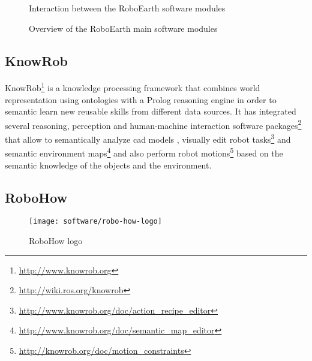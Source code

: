 \begin{figure}[H]
	\begin{floatrow}[2]
		{\caption[Interaction between the RoboEarth software modules]{Interaction between the RoboEarth software modules \cite{DiMarco2013}}\label{fig:robo-earth-software-interaction}}

		{\caption[Overview of the RoboEarth main software modules]{Overview of the RoboEarth main software modules\protect\footnotemark}\label{fig:robo-earth-software-overview}}
	\end{floatrow}
\end{figure}


\subsection{KnowRob}

KnowRob\footnote{\url{http://www.knowrob.org}} \cite{tenorth2011PhD,Tenorth2013k} is a knowledge processing framework that combines world representation using ontologies with a Prolog reasoning engine in order to semantic learn new reusable skills from different data sources. It has integrated several reasoning, perception and human-machine interaction software packages\footnote{\url{http://wiki.ros.org/knowrob}} that allow to semantically analyze \gls{cad} models \cite{Lavoue2005,Tenorth2013cad}, visually edit robot tasks\footnote{\url{http://www.knowrob.org/doc/action_recipe_editor}} and semantic environment maps\footnote{\url{http://www.knowrob.org/doc/semantic_map_editor}} \cite{Pangercic2012} and also perform robot motions\footnote{\url{http://knowrob.org/doc/motion_constraints}} \cite{tenorth14motiontemplates} based on the semantic knowledge of the objects and the environment.


\subsection{RoboHow}

\begin{wrapfigure}{r}{0.23\textwidth}
	\centering
	\vspace*{-2em}
	\texttt{[image: software/robo-how-logo]}
	\caption{RoboHow logo}
	\label{fig:robo-how-logo}
\end{wrapfigure}

